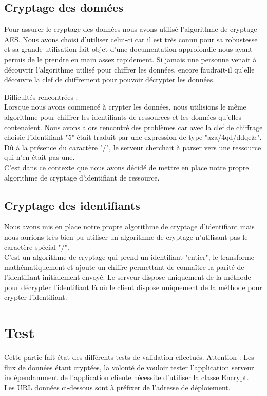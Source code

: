 \subsection{Cryptage des données}
Pour assurer le cryptage des données nous avons utilisé l'algorithme de cryptage AES. Nous avons choisi d'utiliser celui-ci car il est très connu pour sa robustesse et sa grande utilisation fait objet d'une documentation approfondie nous ayant permis de le prendre en main assez rapidement.
Si jamais une personne venait à découvrir l'algorithme utilisé pour chiffrer les données, encore faudrait-il qu'elle découvre la clef de chiffrement pour pouvoir décrypter les données.

Difficultés rencontrées : \\
Lorsque nous avons commencé à crypter les données, nous utilisions le même algorithme pour chiffrer les identifiants de ressources et les données qu'elles contenaient.
Nous avons alors rencontré des problèmes car avec la clef de chiffrage choisie l'identifiant "5" était traduit par une expression de type "aza/4qd/ddqe\&".
Dû à la présence du caractère "/", le serveur cherchait à parser vers une ressource qui n'en était pas une.\\
C'est dans ce contexte que nous avons décidé de mettre en place notre propre algorithme de cryptage d'identifiant de ressource.

\subsection{Cryptage des identifiants}

Nous avons mis en place notre propre algorithme de cryptage d'identifiant mais nous aurions très bien pu utiliser un algorithme de cryptage n'utilisant pas le caractère spécial "/".\\
C'est un algorithme de cryptage qui prend un identifiant "entier", le transforme mathématiquement et ajoute un chiffre permettant de connaître la parité de l'identifiant initialement envoyé.
Le serveur dispose uniquement de la méthode pour décrypter l'identifiant là où le client dispose uniquement de la méthode pour crypter l'identifiant.

\newpage
\section{Test}

Cette partie fait état des différents tests de validation effectués.
Attention : Les flux de données étant cryptées, la volonté de vouloir tester l'application serveur indépendamment de l'application cliente nécessite d'utiliser la classe Encrypt.\\
Les URL données ci-dessous sont à préfixer de l'adresse de déploiement.

